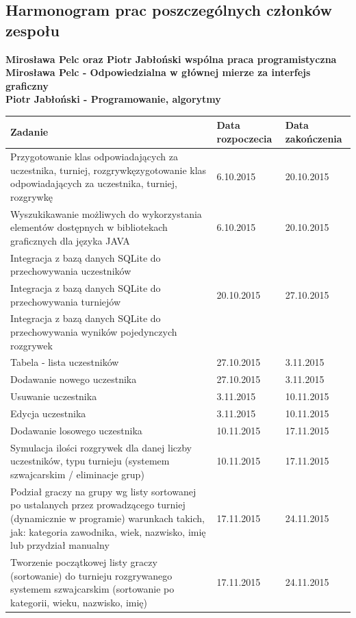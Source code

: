 \subsection{Harmonogram prac poszczególnych członków zespołu}
\textbf{Mirosława Pelc oraz Piotr Jabłoński wspólna praca programistyczna\\
Mirosława Pelc - Odpowiedzialna w głównej mierze za interfejs graficzny\\
Piotr Jabłoński - Programowanie, algorytmy\\}
\begin{tabular}{|p{9cm}|l|p{3cm}|} \hline
Zadanie & Data rozpoczecia & Data zakończenia\\ \hline
Przygotowanie klas odpowiadających za uczestnika, turniej, rozgrywkęzygotowanie klas odpowiadających za uczestnika, turniej, rozgrywkę & 6.10.2015 & 20.10.2015 \\ \hline
Wyszukikawanie możliwych do wykorzystania elementów dostępnych w bibliotekach graficznych dla języka JAVA& 6.10.2015 & 20.10.2015\\ \hline
Integracja z bazą danych SQLite do przechowywania uczestników& &\\
Integracja z bazą danych SQLite do przechowywania turniejów&20.10.2015&27.10.2015\\
Integracja z bazą danych SQLite do przechowywania wyników pojedynczych rozgrywek&&\\ \hline
Tabela - lista uczestników&27.10.2015&3.11.2015\\ \hline
Dodawanie nowego uczestnika&27.10.2015&3.11.2015\\ \hline
Usuwanie uczestnika&3.11.2015&10.11.2015\\ \hline
Edycja uczestnika&3.11.2015&10.11.2015\\ \hline
Dodawanie losowego uczestnika&10.11.2015&17.11.2015\\ \hline
Symulacja ilości rozgrywek dla danej liczby uczestników, typu turnieju (systemem szwajcarskim / eliminacje grup)&10.11.2015&17.11.2015\\ \hline
Podział graczy na grupy wg listy sortowanej po ustalanych przez prowadzącego turniej (dynamicznie w programie) warunkach takich, jak: kategoria zawodnika, wiek, nazwisko, imię lub przydział manualny&17.11.2015&24.11.2015\\ \hline
Tworzenie początkowej listy graczy (sortowanie) do turnieju rozgrywanego systemem szwajcarskim (sortowanie po kategorii, wieku, nazwisko, imię)&17.11.2015&24.11.2015\\ \hline

\end{tabular}
